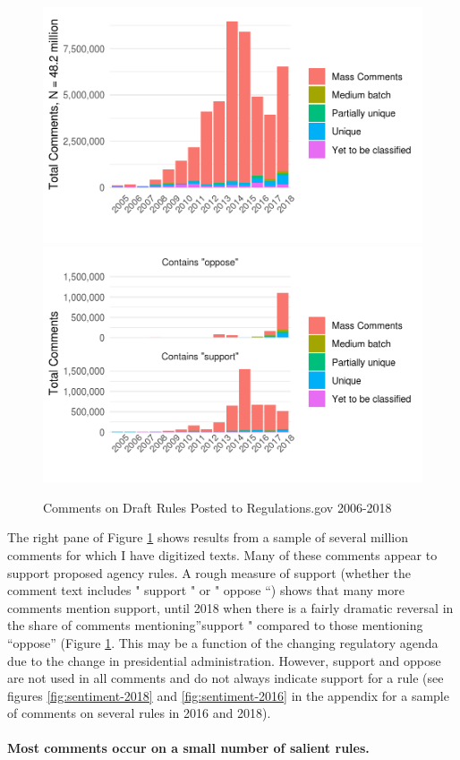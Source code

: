 \documentclass[
      12pt,
        ]{article}
\begin{document}
\begin{figure}

{\centering \includegraphics[width=0.49\linewidth]{../Figs/comments-mass-1} \includegraphics[width=0.49\linewidth]{../Figs/comments-mass-support-vs-oppose-1} 

}

\caption{Comments on Draft Rules Posted to Regulations.gov 2006-2018}\label{fig:comments-support}
\end{figure}

The right pane of Figure
\ref{fig:comments-support} shows results from a sample of several
million comments for which I have digitized texts. Many of these
comments appear to support proposed agency rules. A rough measure of
support (whether the comment text includes " support " or " oppose ``)
shows that many more comments mention support, until 2018 when there is
a fairly dramatic reversal in the share of comments mentioning''support
" compared to those mentioning ``oppose'' (Figure
\ref{fig:comments-support}. This may be a function of the
changing regulatory agenda due to the change in presidential
administration. However, support and oppose are not used in all comments
and do not always indicate support for a rule (see figures
\ref{fig:sentiment-2018} and
\ref{fig:sentiment-2016} in the appendix for a sample of comments
on several rules in 2016 and 2018).

\hypertarget{most-comments-occur-on-a-small-number-of-salient-rules.}{%
\paragraph{Most comments occur on a small number of salient rules.}\label{most-comments-occur-on-a-small-number-of-salient-rules.}}
\end{document}
